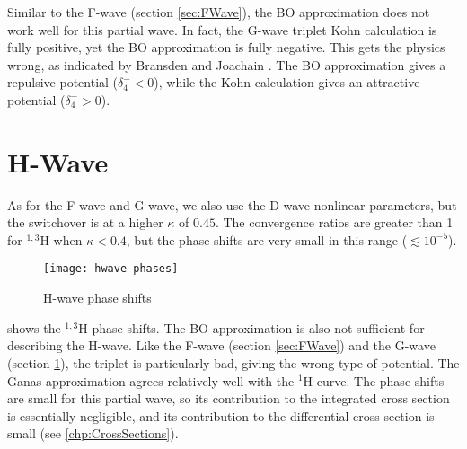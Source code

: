 \documentclass[Dissertation.tex]{subfiles}
\begin{document}
Similar to the F-wave (section \ref{sec:FWave}), the BO approximation 
does not work well for this partial wave. In fact, the G-wave triplet Kohn 
calculation is fully positive, yet the BO approximation is fully negative. 
This gets the physics wrong, as indicated by Bransden and Joachain
\citep[p.589]{Bransden2003}. The BO approximation gives a repulsive potential
($\delta_4^- < 0$), while the Kohn calculation gives an attractive potential
($\delta_4^- > 0$).


\section{H-Wave}
\label{sec:HWave}

As for the F-wave and G-wave, we also use the D-wave nonlinear
parameters, but the switchover is at a higher $\kappa$ of $0.45$.
The convergence ratios are greater than 1 for $^{1,3}$H when
$\kappa < 0.4$, but the phase shifts are very small in this range
($\lesssim 10^{-5}$). 

\begin{figure}
	\centering
	\texttt{[image: hwave-phases]}
	\caption{H-wave phase shifts}
	\label{fig:HWavePhase}
\end{figure}


 shows the $^{1,3}$H phase shifts.
The BO approximation is also not sufficient for describing the H-wave. Like 
the F-wave (section \ref{sec:FWave}) and the G-wave (section \ref{sec:HWave}),
the triplet is particularly bad, giving the wrong type of potential.
The Ganas approximation agrees relatively well with the $^1$H curve. The 
phase shifts are small for this partial wave, so its contribution to the 
integrated cross section is essentially negligible, and its contribution
to the differential cross section is small (see \cref{chp:CrossSections}).
\end{document}
